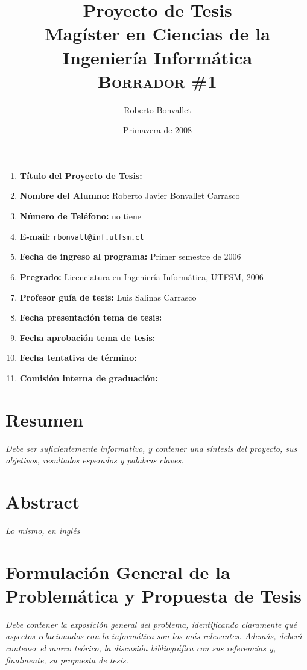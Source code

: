 \documentclass[11pt,spanish]{article}
\title{Proyecto de Tesis \\
    Magíster en Ciencias de la Ingeniería Informática \\
    \textsc{Borrador \#1}
}
\author{Roberto Bonvallet}
\date{Primavera de 2008}
\begin{document}
\maketitle
\thispagestyle{empty}
\begin{enumerate}
    \item \textbf{Título del Proyecto de Tesis:}
 
    \item \textbf{Nombre del Alumno:}
        Roberto Javier Bonvallet Carrasco
    \item \textbf{Número de Teléfono:}
        no tiene
         
    \item \textbf{E-mail:}
        \texttt{rbonvall@inf.utfsm.cl}
    \item \textbf{Fecha de ingreso al programa:}
        Primer semestre de 2006
    \item \textbf{Pregrado:}
        Licenciatura en Ingeniería Informática, UTFSM, 2006
    \item \textbf{Profesor guía de tesis:}
        Luis Salinas Carrasco
    \item \textbf{Fecha presentación tema de tesis:}
    \item \textbf{Fecha aprobación tema de tesis:}
    \item \textbf{Fecha tentativa de término:}
    \item \textbf{Comisión interna de graduación:}
\end{enumerate}

\newpage
\section*{Resumen}

\emph{Debe ser suficientemente informativo, y contener una síntesis del proyecto, sus
objetivos,  resultados esperados y palabras claves. }

\section*{Abstract}

\emph{Lo mismo, en inglés}

\newpage
\section{Formulación General de la Problemática y Propuesta de Tesis}

\emph{Debe contener la exposición general del problema, identificando claramente qué
aspectos relacionados con la informática son los más relevantes.  Además,
deberá contener el marco teórico, la discusión bibliográfica con sus
referencias y, finalmente, su propuesta de tesis.}
    
\end{document}
